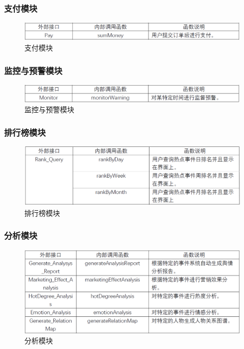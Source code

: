 \subsubsection{支付模块}
\begin{figure}[!htbp]
	\centering
	\includegraphics[scale=0.4]{image/m6.png}
	\caption{支付模块}
\end{figure}
\subsubsection{监控与预警模块}
\begin{figure}[!htbp]
	\centering
	\includegraphics[scale=0.4]{image/m7.png}
	\caption{监控与预警模块}
\end{figure}
\subsubsection{排行榜模块}
\begin{figure}[!htbp]
	\centering
	\includegraphics[scale=0.4]{image/m8.png}
	\caption{排行榜模块}
\end{figure}
\subsubsection{分析模块}
\begin{figure}[!htbp]
	\centering
	\includegraphics[scale=0.4]{image/m9.png}
	\caption{分析模块}
\end{figure}
